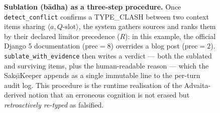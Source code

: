 \begin{figure}[!tbp]
{\begin{tikzpicture}
\end{tikzpicture}}
\caption{\textbf{Sublation (b\=adha) as a three-step procedure.}
Once \texttt{detect\_conflict} confirms a TYPE\_CLASH between two
context items sharing $\langle a, Q\text{-slot}\rangle$, the system
gathers sources and ranks them by their declared limitor precedence
($R$): in this example, the official Django 5 documentation
($\text{prec}=8$) overrides a blog post ($\text{prec}=2$).
\texttt{sublate\_with\_evidence} then writes a verdict --- both the
sublated and surviving items, plus the human-readable reason ---
which the Sak\d{s}\=\i Keeper appends as a single immutable line to
the per-turn audit log.
This procedure is the runtime realisation of the Advaita-derived
notion that an erroneous cognition is not erased but \emph{retroactively
re-typed} as falsified.}
\label{fig:sublation}
\end{figure}
